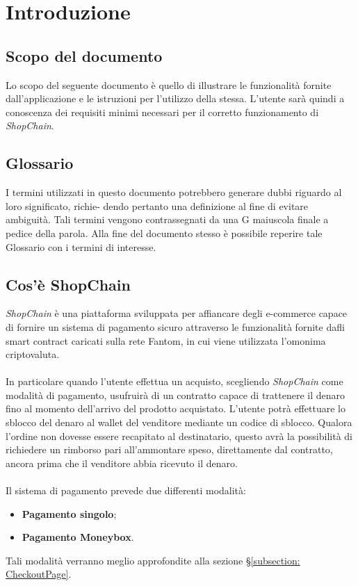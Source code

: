 \section{Introduzione}\label{section:introduzione}

\subsection{Scopo del documento}
Lo scopo del seguente documento è quello di illustrare le funzionalità fornite dall'applicazione e le istruzioni per l'utilizzo della stessa.
L'utente sarà quindi a conoscenza dei requisiti minimi necessari per il corretto funzionamento di \textit{ShopChain}.

\subsection{Glossario}
I termini utilizzati in questo documento potrebbero generare dubbi riguardo al loro significato, richie-
dendo pertanto una definizione al fine di evitare ambiguità. Tali termini vengono contrassegnati da
una G maiuscola finale a pedice della parola. Alla fine del documento stesso è possibile reperire tale Glossario con i termini di interesse.

\subsection{Cos'è ShopChain}
\textit{ShopChain} è una piattaforma sviluppata per affiancare degli e-commerce\glo{} capace di fornire un sistema di pagamento sicuro attraverso le funzionalità fornite dafli smart contract\glo{} caricati sulla rete Fantom\glo{}, in cui viene utilizzata l'omonima criptovaluta\glo{}.\\\\
In particolare quando l'utente effettua un acquisto, scegliendo \textit{ShopChain} come modalità di pagamento, usufruirà di un contratto capace di trattenere il denaro fino al momento dell'arrivo del prodotto acquistato. L'utente potrà effettuare lo sblocco del denaro al wallet\glo{} del venditore mediante un codice di sblocco. Qualora l'ordine non dovesse essere recapitato al destinatario, questo avrà la possibilità di richiedere un rimborso pari all'ammontare speso, direttamente dal contratto, ancora prima che il venditore abbia ricevuto il denaro.\\\\
Il sistema di pagamento prevede due differenti modalità:
\begin{itemize}
    \item \textbf{Pagamento singolo};
    \item  \textbf{Pagamento Moneybox}.
\end{itemize}
Tali modalità verranno meglio approfondite alla sezione §\ref{subsection: CheckoutPage}.


